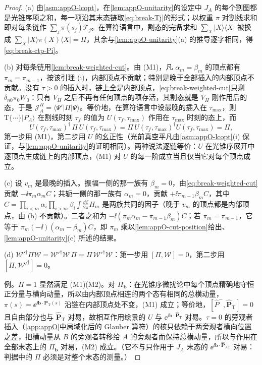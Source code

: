 \begin{proof}
(a) 由\cref{asm:appO-lcopt}，在\cref{lem:appO-unitarity}的设定中 $J_A$ 的每个割图都是光锥序项之和，每一项沿其末态链取\cref{eq:break-Tj}的形式；以权重 $\pi$ 对割线求和即对每条链作 $\sum_j\pi(s_j)\mathcal T_j$。在算符语言中，割态的完备求和 $\sum_X|X\rangle\langle X|$ 被换成 $\sum_X|X\rangle\pi(X)\langle X|=\Pi$，其余与\cref{lem:appO-unitarity}(a) 的推导逐字相同，得\cref{eq:break-ctp-Pi}。

(b) 对每条链用\cref{lem:break-weighted-cut}。由 (M1)，凡 $\alpha_m=\beta_m$ 的顶点都有 $\pi_m=\pi_{m-1}$，按该引理 (i)，内部顶点不贡献；特别是晚于全部插入的内部顶点不贡献。没有 $\tau>0$ 的插入时，链上全是内部顶点，\cref{eq:break-weighted-cut}只剩 $\delta_{n0}\pi_0W_0$：只有 $V_H$ 之后不再有任何顶点的项存活，其割态就是 $V_H$ 刚作用后的态，于是 $\mathcal J_A^\Pi=\langle\Psi'|\Pi|\Psi\rangle$。等价地，在算符语言中设最晚的插入在 $\tau_{\max}$，则 $\mathrm T\{\cdots\}|P_A\rangle$ 在割线时刻 $\tau_f$ 的值为 $U(\tau_f,\tau_{\max})$ 作用在 $\tau_{\max}$ 时刻的态上，而
\[
U(\tau_f,\tau_{\max})^\dagger\,\Pi\,U(\tau_f,\tau_{\max})=\Pi\,U(\tau_f,\tau_{\max})^\dagger U(\tau_f,\tau_{\max})=\Pi ,
\]
第一步用 (M1)，第二步用 $U$ 的幺正性（光前真空平凡由\cref{asm:appO-lcopt}(i) 保证，与\cref{lem:appO-unitarity}的证明相同）。两种说法逐链等价：$U$ 在光锥序展开中逐顶点生成链上的内部顶点，(M1) 对 $U$ 的每一阶成立当且仅当它对每个顶点成立。

(c) 设 $v_m$ 是最晚的插入。振幅一侧的那一族有 $\beta_m=0$，由\cref{eq:break-weighted-cut}贡献 $-\ii\pi_m\alpha_m C$；共轭一侧的那一族有 $\alpha_m=0$，贡献 $+\ii\pi_{m-1}\beta_mC$，其中 $C=\prod_{i<m}\alpha_i\prod_{i>m}\beta_i\int\frac{\dd\mathcal E}{2\pi}H_m$ 是两族共同的因子（晚于 $v_m$ 的顶点都是内部顶点，由 (b) 不贡献）。二者之和为 $-\ii(\pi_m\alpha_m-\pi_{m-1}\beta_m)C$；若 $\pi_m=\pi_{m-1}$，它等于 $\pi_m(-\ii)(\alpha_m-\beta_m)C$，即 $\pi_m$ 乘以\cref{lem:appO-cut-position}给出、\cref{lem:appO-unitarity}(c) 所述的结果。

(d) $\mathcal W'^\dagger\Pi\mathcal W=\mathcal W'^\dagger\mathcal W\,\Pi=\Pi\,\mathcal W'^\dagger\mathcal W$：第一步用 $[\Pi,\mathcal W]=0$，第二步用 $[\Pi,\mathcal W'^\dagger]=0$。

例。$\Pi=1$ 显然满足 (M1)(M2)。对 $\Pi_{\boldsymbol b}$：在光锥序微扰论中每个顶点精确地守恒正分量与横向动量，所以由内部顶点相连的两个态有相同的总横动量，$\pi(s)=\ee^{\ii\boldsymbol b\cdot\boldsymbol P_{\mathrm T}(s)}$ 沿链在内部顶点处不变，(M1) 成立；等价地，$[\hat P^-,\hat{\boldsymbol P}_{\mathrm T}]=0$ 且自由部分也与 $\hat{\boldsymbol P}_{\mathrm T}$ 对易，故相互作用绘景的 $U$ 与 $\ee^{\ii\boldsymbol b\cdot\hat{\boldsymbol P}_{\mathrm T}}$ 对易。$\tau=0$ 的旁观者插入（\cref{app:appO}中局域化后的 Glauber 算符）的核只依赖于两旁观者横向位置之差，把横动量从 $B$ 的旁观者转移给 $A$ 的旁观者而保持总横动量，所以与作用在全部末态上的 $\Pi_{\boldsymbol b}$ 对易，(M2) 成立。（它不与只作用于 $J_A$ 末态的 $\ee^{\ii\boldsymbol b\cdot\hat{\boldsymbol P}_{A\mathrm T}}$ 对易：判据中的 $\Pi$ 必须是对整个末态的测量。）
\end{proof}

